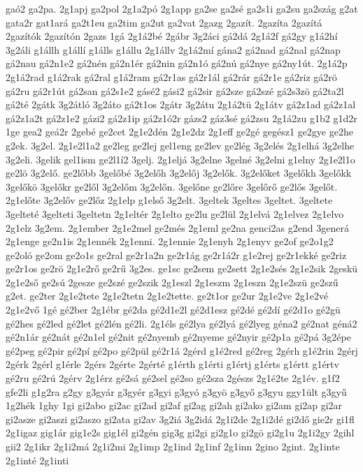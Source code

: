 {gaó2
ga2pa.
2g1apj
ga2pol
2g1a2pó
2g1app
ga2se
ga2sé
ga2s1i
ga2su
ga2szág
g2at
gata2r
gat1ará
ga2t1eu
ga2tim
ga2ut
ga2vat
2gazg
2gazít.
2gazíta
2gazítá
2gazítók
2gazítón
2gazs
1gá
2g1á2bé
2gábr
3g2áci
gá2dá
2g1á2f
gá2gy
g1á2hí
3g2áli
g1állh
g1állí
g1álls
g1állu
2g1állv
2g1á2mí
gána2
gá2nad
gá2nal
gá2nap
gá2nau
gá2n1e2
gá2nén
gá2n1ér
gá2nin
gá2n1ó
gá2nú
gá2nye
gá2ny1út.
2g1á2p
2g1á2rad
g1á2rak
gá2ral
g1á2ram
gá2r1as
gá2r1ál
gá2rár
gá2r1e
gá2riz
gá2rö
gá2ru
gá2r1út
gá2san
gá2s1e2
gásé2
gási2
gá2sir
gá2sze
gá2szé
gá2s3zö
gá2ta2l
gá2té
2gátk
3g2átló
3g2áto
gá2t1os
2gátr
3g2átu
2g1á2tü
2g1átv
gá2z1ad
gá2z1al
gá2z1a2t
gá2z1e2
gázi2
gá2z1ip
gá2z1ó2r
gázs2
gáz3sé
gá2zsu
2g1á2zu
g1b2
g1d2r
1ge
gea2
geá2r
2gebé
ge2cet
2g1e2dén
2g1e2dz
2g1eff
ge2gé
gegész1
ge2gye
ge2he
g2ek.
3g2el.
2g1e2l1a2
ge2leg
ge2lej
gel1eng
ge2lev
ge2lég
3g2elés
2g1elhá
3g2elhe
3g2eli.
3gelik
gel1ism
ge2l1í2
3gelj.
2g1eljá
3g2elne
3gelné
3g2elni
g1elny
2g1e2l1o
ge2lö
3g2elő.
ge2lőbb
3gelőbé
3g2előh
3g2előj
3g2elők.
3g2előket
3gelőkh
3gelőkk
3gelőkö
3gelőkr
ge2lől
3g2előm
3g2előn.
3gelőne
ge2lőre
3gelőrő
ge2lős
3gelőt.
2g1előte
3g2előv
ge2lőz
2g1elp
g1első
3g2elt.
3geltek
3geltes
3geltet.
3geltete
3gelteté
3gelteti
3geltetn
2g1eltér
2g1elto
ge2lu
ge2lül
2g1elvá
2g1elvez
2g1elvo
2g1elz
3g2em.
2g1ember
2g1e2mel
ge2més
2g1eml
ge2na
genci2as
g2end
3generá
2g1enge
ge2n1is
2g1ennék
2g1enni.
2g1ennie
2g1enyh
2g1enyv
ge2of
ge2o1g2
ge2oló
ge2om
ge2o1s
ge2ral
ge2r1a2n
ge2r1ág
ge2r1á2r
g1e2rej
ge2r1ekké
ge2riz
ge2r1os
ge2rö
2g1e2rő
ge2rű
3g2es.
ge1sc
ge2sem
ge2sett
2g1e2sés
2g1e2sik
2geskü
2g1e2ső
ge2sú
2gesze
ge2szé
ge2szik
2g1eszl
2g1eszm
2g1eszn
2g1e2szü
ge2szű
g2et.
ge2ter
2g1e2tete
2g1e2tetn
2g1e2tette.
ge2t1or
ge2ur
2g1e2ve
2g1e2vé
2g1e2vő
1gé
gé2ber
2g1ébr
gé2da
gé2d1e2l
gé2d1esz
gé2dé
gé2dí
gé2d1o
gé2gü
gé2hes
gé2led
gé2let
gé2lén
gé2li.
2g1éls
gé2lya
gé2lyá
gé2lyeg
géna2
gé2nat
géná2
gé2n1ár
gé2nát
gé2n1el
gé2nit
gé2nyemb
gé2nyeme
gé2nyir
gé2p1a
gé2pá
3g2épe
gé2peg
gé2pir
gé2pí
gé2po
gé2pül
gé2r1á
2gérd
g1é2red
gé2reg
2gérh
g1é2rin
2gérj
2gérk
2gérl
g1érle
2gérs
2gérte
2gérté
g1érth
g1érti
g1értj
g1érts
g1értt
g1értv
gé2ru
gé2rú
2gérv
2g1érz
gé2sá
gé2sel
gé2so
gé2sza
2gészs
2g1é2te
2g1év.
g1f2
gfe2li
g1g2ra
g2gy
g3gyár
g3gyér
g3gyi
g3gyó
g3gyö
g3győ
g3gyu
ggy1ült
g3gyű
1g2hék
1ghy
1gi
gi2abo
gi2ac
gi2ad
gi2af
gi2ag
gi2ah
gi2ako
gi2am
gi2ap
gi2ar
gi2asze
gi2aszi
gi2aszo
gi2ata
gi2av
3g2iá
3g2idá
2g1i2de
2g1i2dé
gi2dő
gie2r
gi1fl
2g1igaz
gig1ár
gig1e2s
gig1él
gi2gén
gig3g
gi2gi
gi2g1o
gi2gö
gi2g1u
2g1i2gy
2gihl
gii2
2g1ikr
2g1i2má
2g1i2mi
2g1imp
2g1ind
2g1inf
2g1inn
2gino
2gint.
2g1inte
2g1inté
2g1inti
}
